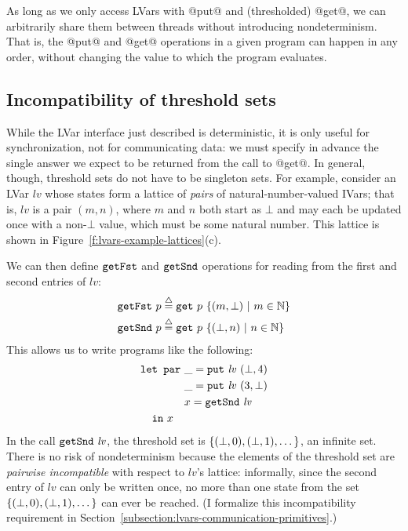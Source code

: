 As long as we only access LVars with @put@ and (thresholded) @get@, we
can arbitrarily share them between threads without introducing
nondeterminism. That is, the @put@ and @get@ operations in a given
program can happen in any order, without changing the value to which
the program evaluates.

\subsection{Incompatibility of threshold sets}

While the LVar interface just described is deterministic, it is only useful for
synchronization, not for communicating data: we must specify in advance the
single answer we expect to be returned from the call to @get@.  In general,
though, threshold sets do not have to be singleton sets.  For example, consider
an LVar $\mathit{lv}$ whose states form a lattice of \emph{pairs} of
natural-number-valued IVars; that is, $\mathit{lv}$ is a pair $(m, n)$, where
$m$ and $n$ both start as $\bot$ and may each be updated once with a non-$\bot$
value, which must be some natural number.
This lattice is shown in Figure~\ref{f:lvars-example-lattices}(c).

We can then define $\mbox{\texttt{getFst}}$ and
$\mbox{\texttt{getSnd}}$ operations for reading from the first and second entries of
$\mathit{lv}$:
\begin{align*}
\mbox{\texttt{getFst}}~p & \stackrel{\triangle}{=} \mbox{\texttt{get}}~p~\lbrace (m, \bot) \ | \  m \in
    \mathbb{N} \rbrace \\
\mbox{\texttt{getSnd}}~p & \stackrel{\triangle}{=} \mbox{\texttt{get}}~p~\lbrace (\bot, n) \ | \  n \in
    \mathbb{N} \rbrace
\end{align*}
This allows us to write programs like the following:
\begin{equation}
\begin{split}
& \LETPAR ~\_ = \putexp{\mathit{lv}}{(\bot, 4)} \\
&  \letparspace ~\_ = \putexp{\mathit{lv}}{(3, \bot)} \\
&  \letparspace ~x = \getsndexp{\mathit{lv}} \\
&  \letspace \IN~x
\end{split}
\label{e:lvar-example-4}
\end{equation}
In the call $\mbox{\texttt{getSnd}}~\mathit{lv}$, the threshold set is
$\left\{(\bot, 0), (\bot, 1), \dots\right\}$, an infinite set.  There is no
risk of nondeterminism because the elements of the threshold set are
\emph{pairwise incompatible} with respect to $\mathit{lv}$'s lattice:
informally, since the second entry of $\mathit{lv}$ can only be
written once, no more than one state from the set $\left\{(\bot, 0),
  (\bot, 1), \dots\right\}$ can ever be reached.  (I formalize this
incompatibility requirement in
Section~\ref{subsection:lvars-communication-primitives}.)

